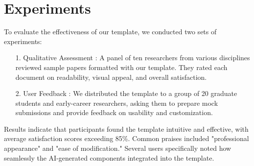 \vspace{-2mm}
\section{Experiments}

To evaluate the effectiveness of our template, we conducted two sets of experiments:

\begin{itemize}[leftmargin=7mm,itemsep=2mm, topsep=0em]
    \item[1.] Qualitative Assessment : A panel of ten researchers from various disciplines reviewed sample papers formatted with our template. They rated each document on readability, visual appeal, and overall satisfaction.
    \item[2.] User Feedback : We distributed the template to a group of 20 graduate students and early-career researchers, asking them to prepare mock submissions and provide feedback on usability and customization.
\end{itemize}

Results indicate that participants found the template intuitive and effective, with average satisfaction scores exceeding 85\%. Common praises included "professional appearance" and "ease of modification." Several users specifically noted how seamlessly the AI-generated components integrated into the template.
